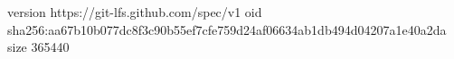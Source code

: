 version https://git-lfs.github.com/spec/v1
oid sha256:aa67b10b077dc8f3c90b55ef7cfe759d24af06634ab1db494d04207a1e40a2da
size 365440
